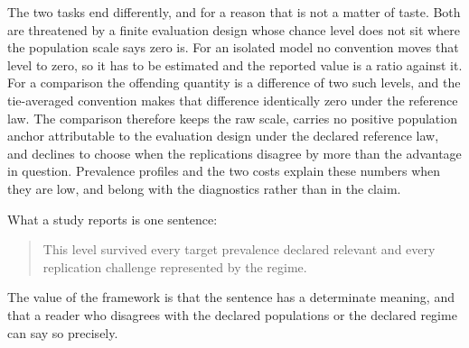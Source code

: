 \documentclass[11pt]{article}
\theoremstyle{remark}
\begin{document}
The two tasks end differently, and for a reason that is not a matter of taste. Both are threatened by a finite evaluation design whose chance level does not sit where the population scale says zero is. For an isolated model no convention moves that level to zero, so it has to be estimated and the reported value is a ratio against it. For a comparison the offending quantity is a difference of two such levels, and the tie-averaged convention makes that difference identically zero under the reference law. The comparison therefore keeps the raw scale, carries no positive population anchor attributable to the evaluation design under the declared reference law, and declines to choose when the replications disagree by more than the advantage in question. Prevalence profiles and the two costs explain these numbers when they are low, and belong with the diagnostics rather than in the claim.

What a study reports is one sentence:

\begin{quote}
This level survived every target prevalence declared relevant and every replication challenge represented by the regime.
\end{quote}

The value of the framework is that the sentence has a determinate meaning, and that a reader who disagrees with the declared populations or the declared regime can say so precisely.
\end{document}
